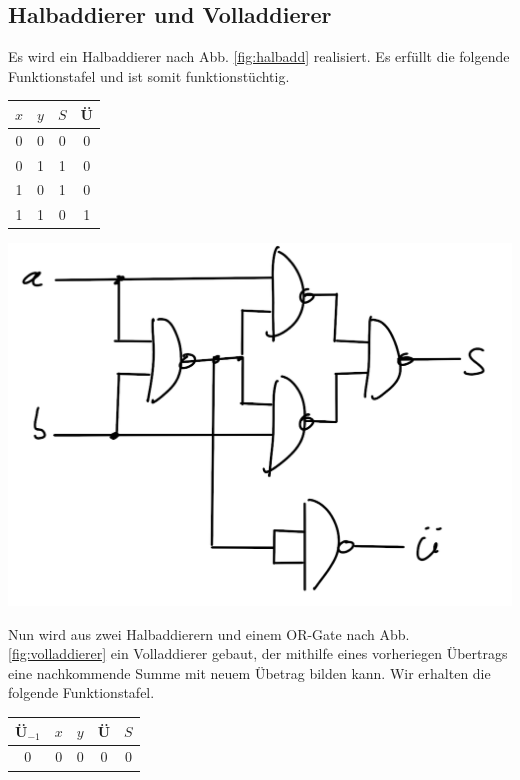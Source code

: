 \documentclass[10pt]{article}
\newenvironment{Figure}
  {\par\medskip\noindent\minipage{\linewidth}}
  {\endminipage\par\medskip}
\begin{document}
\begin{multicols}{2}
	\subsection{Halbaddierer und Volladdierer}
	Es wird ein Halbaddierer nach Abb. \ref{fig:halbadd} realisiert. Es erfüllt die folgende Funktionstafel und ist somit funktionstüchtig.
	\begin{center}
		\begin{tabular}{|c|c|c|c|}
			\hline
			$x$ & $y$ & $S$ & Ü \\
			\hline
			0   & 0   & 0   & 0 \\
			0   & 1   & 1   & 0 \\
			1   & 0   & 1   & 0 \\
			1   & 1   & 0   & 1 \\
			\hline
		\end{tabular}
	\end{center}
	\begin{Figure}
		\centering\includegraphics[width=1\textwidth]{halbaddierer.png}
		\label{fig:halbadd}
	\end{Figure}
	Nun wird aus zwei Halbaddierern und einem OR-Gate nach Abb. \ref{fig:volladdierer} ein Volladdierer gebaut, der mithilfe eines vorheriegen Übertrags eine nachkommende Summe mit neuem Übetrag bilden kann. Wir erhalten die folgende Funktionstafel.
	\begin{center}
		\begin{tabular}{|c|c|c|c|c|}
			\hline
			Ü$_{-1}$ & $x$ & $y$ & Ü & $S$ \\
			\hline
			0        & 0   & 0   & 0   & 0   \\

\end{tabular}
\end{center}
\end{multicols}
\end{document}
